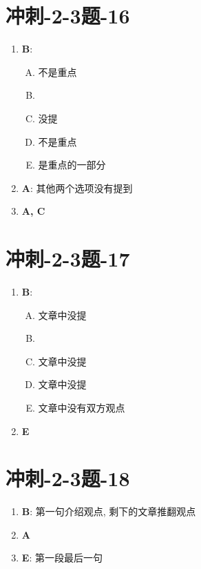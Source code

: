 \section{冲刺-2-3题-16}

  \begin{enumerate}
    \item \textbf{B}:
    \begin{enumerate}[A.]
      \item 不是重点
      \item %
      \item 没提
      \item 不是重点
      \item {}是重点的一部分
    \end{enumerate}

    \item \textbf{A}: 其他两个选项没有提到
    \item \textbf{A, C}
  \end{enumerate}

\section{冲刺-2-3题-17}

  \begin{enumerate}
    \item \textbf{B}:
    \begin{enumerate}[A.]
      \item {}文章中没提
      \item %
      \item {}文章中没提
      \item {}文章中没提
      \item 文章中没有双方观点
    \end{enumerate}

    \item \textbf{E}
  \end{enumerate}

\section{冲刺-2-3题-18}

  \begin{enumerate}
    \item \textbf{B}: 第一句介绍观点, 剩下的文章推翻观点
    \item \textbf{A}
    \item \textbf{E}: 第一段最后一句
  \end{enumerate}

